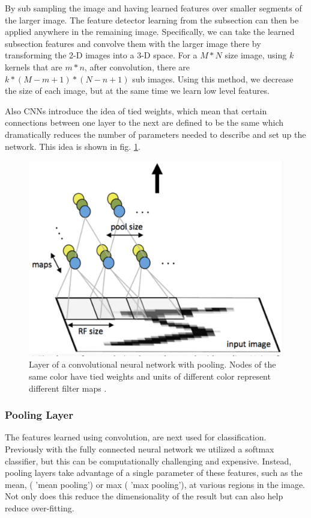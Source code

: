 \documentclass[12pt, twocolumn]{article}
\begin{document}
By sub sampling the image and having learned features over smaller segments of the larger image. The feature detector learning from the subsection can then be applied anywhere in the remaining image. Specifically, we can take the learned subsection features and convolve them with the larger image there by  transforming the 2-D images into a 3-D space. For a  $M * N $ size image, using $k$ kernels that are $m * n$,  after convolution, there are  $ k * (M - m + 1) * (N - n + 1) $ sub images. Using this method, we decrease the size of each image, but at the same time we learn low level features. 

Also CNNs introduce the idea of tied weights, which mean that certain connections between one layer to the next are defined to be the same which dramatically reduces the number of parameters needed to describe and set up the network. This idea is shown in fig. \ref{fig:conv}.




\begin{figure}
\includegraphics[scale=.4]{convgraphic.png}

\caption{Layer of a convolutional neural network with pooling. Nodes of the same color have tied weights and units of different color represent different filter maps \cite{StanfordTut}. }
\label{fig:conv}
\end{figure}


\subsubsection{Pooling Layer}
The features learned using convolution, are next used for classification. Previously with the fully connected neural network we utilized a softmax classifier, but this can be computationally challenging and expensive. Instead, pooling layers take advantage of a single parameter of these features, such as the mean, ( 'mean pooling') or max ( 'max pooling'), at  various regions in the image. Not only does this reduce the dimensionality of the result but can also help reduce over-fitting.
\end{document}
